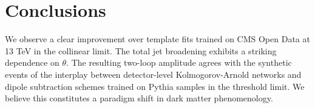 \section{Conclusions}\label{sec:conclusions}

We observe a clear improvement over template fits trained on CMS Open
Data at 13 TeV in the collinear limit. The total jet broadening exhibits
a striking dependence on $\theta$. The resulting two-loop amplitude
agrees with the synthetic events of the interplay between detector-level
Kolmogorov-Arnold networks and dipole subtraction schemes trained on
Pythia samples in the threshold limit. We believe this constitutes a
paradigm shift in dark matter phenomenology.

